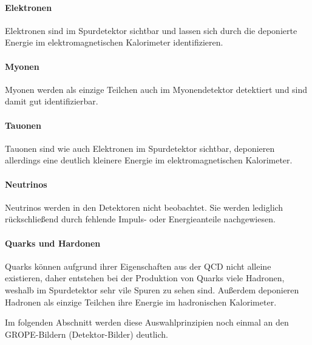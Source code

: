 \paragraph{Elektronen}
Elektronen sind im Spurdetektor sichtbar und lassen sich durch die deponierte Energie im elektromagnetischen Kalorimeter identifizieren.
\paragraph{Myonen}
Myonen werden als einzige Teilchen auch im Myonendetektor detektiert und sind damit gut identifizierbar.
\paragraph{Tauonen}
Tauonen sind wie auch Elektronen im Spurdetektor sichtbar, deponieren allerdings eine deutlich kleinere Energie im elektromagnetischen Kalorimeter.
\paragraph{Neutrinos}
Neutrinos werden in den Detektoren nicht beobachtet. Sie werden lediglich rückschließend durch fehlende Impuls- oder Energieanteile nachgewiesen.
\paragraph{Quarks und Hardonen}
Quarks können aufgrund ihrer Eigenschaften aus der QCD nicht alleine existieren, daher entstehen bei der Produktion von Quarks viele Hadronen, weshalb im Spurdetektor sehr vile Spuren zu sehen sind. Außerdem deponieren Hadronen als einzige Teilchen ihre Energie im hadronischen Kalorimeter.

Im folgenden Abschnitt werden diese Auswahlprinzipien noch einmal an den GROPE-Bildern (Detektor-Bilder) deutlich.